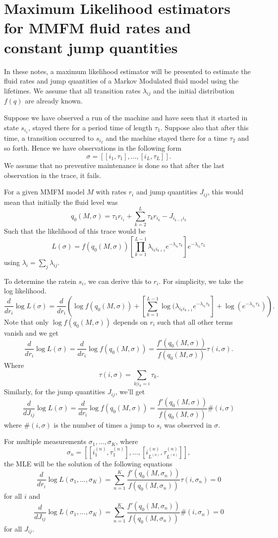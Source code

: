 


\chapter{Maximum Likelihood estimators for MMFM fluid rates and constant jump quantities}
In these notes, a maximum likelihood estimator will be presented to estimate the fluid rates and jump quantities of a Markov Modulated fluid model using the lifetimes.
We assume that all transition rates $\lambda_{ij}$ and the initial distribution $f(q)$ are already known.

Suppose we have observed a run of the machine and have seen that it started in state $s_{i_1}$, stayed there for a period time of length $\tau_1$.
Suppose also that after this time, a transition occurred to $s_{i_2}$ and the machine stayed there for a time $\tau_2$ and so forth.
Hence we have observations in the following form
$$
\sigma=\left[[i_1,\tau_1],...,[i_L,\tau_L] \right].
$$
We assume that no preventive maintenance is done so that after the last observation in the trace, it fails.

For a given MMFM model $M$ with rates $r_i$ and jump quantities $J_{ij}$, this would mean that initially the fluid level was
$$
q_0(M,\sigma)=\tau_1r_{i_1}+\sum\limits_{k=2}^{L}\tau_kr_{i_k}-J_{i_{k-1}i_k}
$$
Such that the likelihood of this trace would be
$$
L(\sigma)=f(q_0(M,\sigma))\left[\prod\limits_{k=1}^{L-1}\lambda_{i_ki_{k+1}}e^{-\lambda_{i_k}\tau_k}\right]e^{-\lambda_{i_L}\tau_L}
$$
using $\lambda_i=\sum_j\lambda_{ij}$.

To determine the ratein $s_i$, we can derive this to $r_i$.
For simplicity, we take the log likelihood.
$$
\frac{d}{dr_i}\log L(\sigma)
=\frac{d}{dr_i}\left(\log f(q_0(M,\sigma))
+\left[\sum\limits_{k=1}^{L-1}\log(\lambda_{i_ki_{k+1}}e^{-\lambda_{i_k}\tau_k}\right]
+\log(e^{-\lambda_{i_L}\tau_L})\right).
$$
Note that only $\log f(q_0(M,\sigma))$ depends on $r_i$ such that all other terms vanish and we get
$$
\frac{d}{dr_i}\log L(\sigma)=\frac{d}{dr_i}\log f(q_0(M,\sigma))=\frac{f'(q_0(M,\sigma))}{f(q_0(M,\sigma))}\tau(i,\sigma).
$$
Where 
$$
\tau(i,\sigma)=\sum\limits_{k|i_k=i}\tau_k.
$$
Similarly, for the jump quantities $J_{ij}$, we'll get
$$
\frac{d}{dJ_{ij}}\log L(\sigma)=\frac{d}{dr_i}\log f(q_0(M,\sigma))=\frac{f'(q_0(M,\sigma))}{f(q_0(M,\sigma))}\#(i,\sigma)
$$
where $\#(i,\sigma)$ is the number of times a jump to $s_i$ was observed in $\sigma$.

For multiple measurements  $\sigma_1,...,\sigma_K$, where
$$
\sigma_n=\left[[i_1^{(n)},\tau_1^{(n)}],...,[i_{L^{(n)}}^{(n)},\tau_{L^{(n)}}^{(n)}] \right],
$$
the MLE will be the solution of the following equations
$$
\frac{d}{dr_i}\log L(\sigma_1,...,\sigma_K)=\sum\limits_{n=1}^K\frac{f'(q_0(M,\sigma_n))}{f(q_0(M,\sigma_n))}\tau(i,\sigma_n)=0
$$
for all $i$ and 
$$
\frac{d}{dJ_{ij}}\log L(\sigma_1,...,\sigma_K)=\sum\limits_{n=1}^K\frac{f'(q_0(M,\sigma_n))}{f(q_0(M,\sigma_n))}\#(i,\sigma_n)=0
$$
for all $J_{ij}$.

